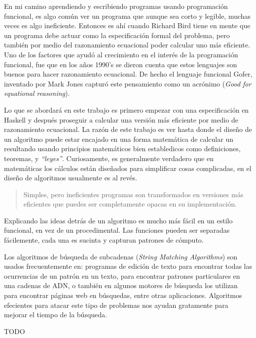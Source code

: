 En mi camino aprendiendo y escribiendo programas usando programación funcional, es algo común ver un programa
que aunque sea corto y legible, muchas veces es algo ineficiente. Entonces es ahí cuando Richard Bird tiene
en mente que un programa debe actuar como la especificación formal del problema, pero también por medio del
razonamiento ecuacional poder calcular uno más eficiente.
Uno de los factores que ayudó al crecimiento en el interés de la programación funcional, fue que en los años
1990's se dieron cuenta que estos lenguajes son buenos para hacer razonamiento ecuacional.
De hecho el lenguaje funcional Gofer, inventado por Mark Jones capturó este pensamiento como un acrónimo 
(\textit{Good for equational reasoning}).
\newline

Lo que se abordará en este trabajo es primero empezar con una especificación en Haskell y después proseguir a
calcular una versión más eficiente por medio de razonamiento ecuacional.
La razón de este trabajo es ver hasta donde el diseño de un algoritmo puede estar encajado en una forma
matemática de calcular un resultando usando principios matemáticos bien establedicos como definiciones, 
teoremas, y \textit{``leyes''}.
Curiosamente, es generalmente verdadero que en matemáticas los cálculos están diseñados para simplificar
cosas complicadas, en el diseño de algoritmos usualmente es al revés.
\begin{quote}
Simples, pero ineficientes programas son transformados en versiones más eficientes que puedes ser
completamente opacas en su implementación.
\end{quote}
Explicando las ideas detrás de un algoritmo es mucho más fácil en un estilo funcional, en vez de un
procedimental. Las funciones pueden ser separadas fácilemente, cada una es sucinta y capturan patrones
de cómputo.
\newline

Los algoritmos de búsqueda de subcadenas (\textit{String Matching Algorithms}) son usados frecuentemente en:
programas de edición de texto para encontrar todas las ocurrencias de un patrón en un texto, para encontrar
patrones particulares en una cadenas de ADN, o también en algunos motores de búsqueda los utilizan para
encontrar páginas web en búsquedas, entre otras aplicaciones. Algoritmos efecientes para atacar este tipo de
problemas nos ayudan gratamente para mejorar el tiempo de la búsqueda.
\newline

TODO
